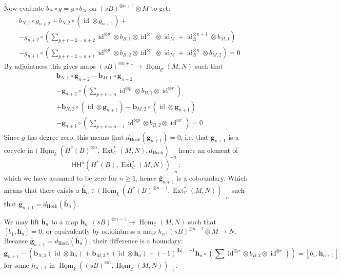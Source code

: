 \documentclass{amsart}
\numberwithin{equation}{section}
\let\cal\mathcal
\theoremstyle{definition}
\theoremstyle{remark}
\begin{document}
Now evaluate $b_N\circ g=g\circ b_M$ on $(sB)^{\otimes n+1}\otimes M$ to get:
\begin{align*}
&b_{N,1}\circ g_{n+2} +b_{N,2}\circ({{\operatorname {id}}}\otimes g_{n+1}) + \\
&-g_{n+2}\circ \left( \sum_{p+r+2=n+2} {{\operatorname {id}}}^{\otimes p}\otimes b_{B,1}\otimes {{\operatorname {id}}}^{\otimes r}\otimes {{\operatorname {id}}}_M + {{\operatorname {id}}}_B^{\otimes n+1}\otimes b_{M,1}\right) \\
&-g_{n+1}\circ \left( \sum_{p+r+2=n+1} {{\operatorname {id}}}^{\otimes p}\otimes b_{B,2}\otimes {{\operatorname {id}}}^{\otimes r}\otimes {{\operatorname {id}}}_M + {{\operatorname {id}}}_B^{\otimes n}\otimes b_{M,2}\right)=0
\end{align*}
By adjointness this gives maps $(sB)^{\otimes n+1}\to \underline{\operatorname {Hom}}_{{\cal C}}(M,N)$ such that
\begin{align*}
&\textbf{b}_{N,1}\circ \textbf{g}_{n+2} - \textbf{b}_{M,1}\circ \textbf{g}_{n+2} \\
&-\textbf{g}_{n+2}\circ \left( \sum_{p+r=n} {{\operatorname {id}}}^{\otimes p}\otimes b_{B,1}\otimes {{\operatorname {id}}}^{\otimes r}\right) \\
&+\textbf{b}_{N,2}\circ({{\operatorname {id}}}\otimes \textbf{g}_{n+1}) -\textbf{b}_{M,2}\circ ({{\operatorname {id}}}\otimes \textbf{g}_{n+1})   \\
&-\textbf{g}_{n+1}\circ \left( \sum_{p+r=n-1} {{\operatorname {id}}}^{\otimes p}\otimes b_{B,2}\otimes {{\operatorname {id}}}^{\otimes r} \right)=0
\end{align*}
Since $g$ has degree zero, this means that
$d_{\mathrm{Hoch}}(\bar{\textbf{g}}_{n+1})=0$, i.e. that
$\bar{\textbf{g}}_{n+1}$ is a cocycle in $(\underline{\operatorname {Hom}}_k(H^*(B)^{\otimes
  n},{\operatorname {Ext}}^*_{{\cal C}}(M,N),d_{\mathrm{Hoch}})_{-n}$ hence an element of
\[{\mathsf{HH}}^{n}(H^*(B),{\operatorname {Ext}}^*_{{\cal C}}(M,N))_{-n}\,;\]
which we have assumed to be zero for $n\geq 1$, hence $\bar{\textbf{g}}_{n+1}$ is a coboundary. Which means that there exists a $\bar{\textbf{h}}_n \in (\underline{\operatorname {Hom}}_k(H^*(B)^{\otimes n-1},{\operatorname {Ext}}^*_{{\cal C}}(M,N))_{-n}$ such that $\bar{\textbf{g}}_{n+1}=d_{\mathrm{Hoch}}(\bar{\textbf{h}}_n)$. 

We may lift $\bar{\textbf{h}}_n$ to a map $\textbf{h}_n:(sB)^{\otimes n-1}\to {\operatorname {Hom}}_{{\cal C}}(M,N)$ such that $[b_1,\textbf{h}_n]=0$, or equivalently by adjointness a map $h_n:(sB)^{\otimes n-1}\otimes M\to N$. Because $\bar{\textbf{g}}_{n+1}=d_{\mathrm{Hoch}}(\bar{\textbf{h}}_n)$, their difference is a boundary:
\begin{equation}\label{ref-9.14-67}
  \textbf{g}_{n+1}-(\textbf{b}_{N,2}({{\operatorname {id}}}\otimes \textbf{h}_n)+ \textbf{b}_{M,2}\circ({{\operatorname {id}}}\otimes \textbf{h}_n) -(-1)^{|\textbf{h}|=-1} \textbf{h}_n\circ(\sum {{\operatorname {id}}}^{\otimes p}\otimes b_{B,2}\otimes {{\operatorname {id}}}^{\otimes r}))=[b_1,\textbf{h}_{n+1}]
\end{equation}
for some $h_{n+1}$ in $\underline{\operatorname {Hom}}_k((sB)^{\otimes n},\underline{\operatorname {Hom}}_{{\cal C}}(M,N))_{-1}$. 
\end{document}
